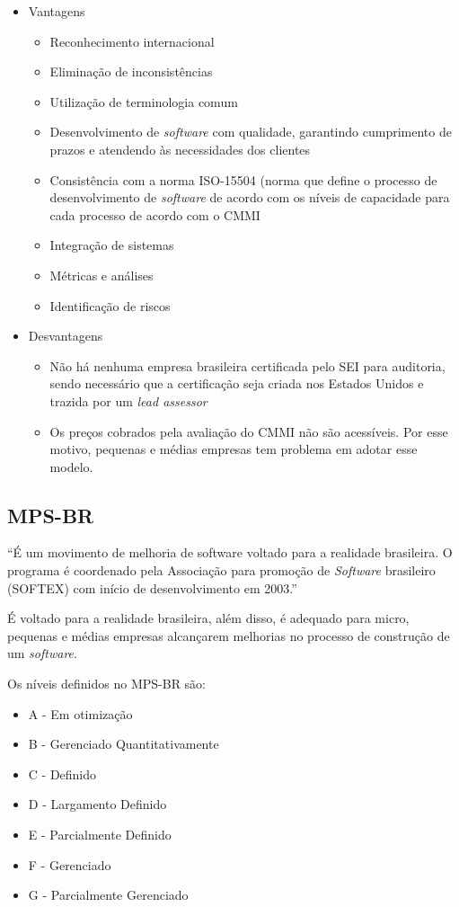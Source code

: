 \begin{itemize}
	\item Vantagens
		\begin{itemize}
			\item Reconhecimento internacional
			\item Eliminação de inconsistências
			\item Utilização de terminologia comum
			\item Desenvolvimento de \textit{software} com qualidade, garantindo cumprimento de prazos e atendendo às necessidades dos clientes 
			\item Consistência com a norma ISO-15504 (norma que define o processo de desenvolvimento de \textit{software} de acordo com os níveis de capacidade para cada processo de acordo com o CMMI~\cite{cortes}
			\item Integração de sistemas
			\item Métricas e análises
			\item Identificação de riscos
		\end{itemize}
	\item Desvantagens
		\begin{itemize}
			\item Não há nenhuma empresa brasileira certificada pelo SEI para auditoria, sendo necessário que a certificação seja criada nos Estados Unidos e trazida por um \textit{lead assessor}
			\item Os preços cobrados pela avaliação do CMMI não são acessíveis. Por esse motivo, pequenas e médias empresas tem problema em adotar esse modelo.
		\end{itemize}
\end{itemize}

\subsection{MPS-BR}

“É um movimento de melhoria de software voltado para a realidade brasileira. O programa é coordenado pela Associação para promoção de \textit{Software} brasileiro (SOFTEX) com início de desenvolvimento em 2003.”~\cite{softex}

É voltado para a realidade brasileira, além disso, é adequado para micro, pequenas e médias empresas alcançarem melhorias no processo de construção de um \textit{software}.

Os níveis definidos no MPS-BR são:

\begin{itemize}
	\item A - Em otimização
	\item B - Gerenciado Quantitativamente
	\item C - Definido
	\item D - Largamento Definido
	\item E - Parcialmente Definido
	\item F - Gerenciado
	\item G - Parcialmente Gerenciado
\end{itemize}

